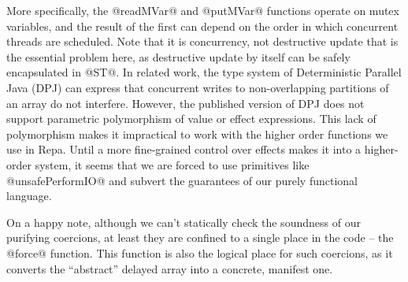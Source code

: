More specifically, the @readMVar@ and @putMVar@ functions operate on mutex variables, and the result of the first can depend on the order in which concurrent threads are scheduled. Note that it is concurrency, not destructive update that is the essential problem here, as destructive update by itself can be safely encapsulated in @ST@. In related work, the type system of Deterministic Parallel Java (DPJ) \cite{adve:type-system-dpj} can express that concurrent writes to non-overlapping partitions of an array do not interfere. However, the published version of DPJ does not support parametric polymorphism of value or effect expressions. This lack of polymorphism makes it impractical to work with the higher order functions we use in Repa. Until a more fine-grained control over effects makes it into a higher-order system, it seems that we are forced to use primitives like @unsafePerformIO@ and subvert the guarantees of our purely functional language. 

On a happy note, although we can't statically check the soundness of our purifying coercions, at least they are confined to a single place in the code -- the @force@ function. This function is also the logical place for such coercions, as it converts the ``abstract'' delayed array into a concrete, manifest one.
